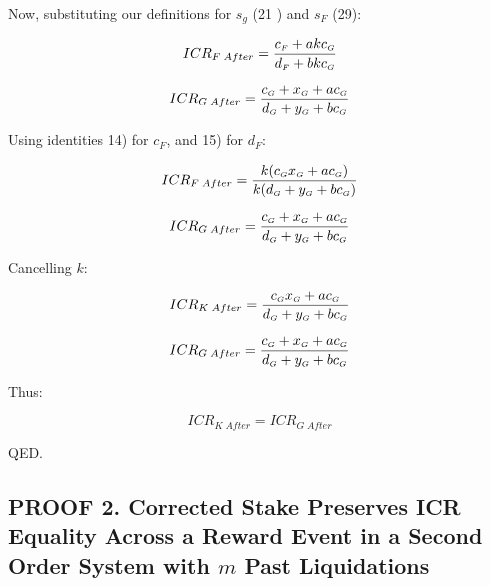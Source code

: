 \documentclass[reqno]{article}
\begin{document}
\bigskip
Now, substituting our definitions for $s_g$ (21 ) and $s_F$ (29):

\begin{equation} 
    ICR_{F \; After}=\frac{c_\mathsmaller{F}+akc_\mathsmaller{G}}{d_\mathsmaller{F}+bkc_\mathsmaller{G}}
\end{equation}

\begin{equation} 
    ICR_{G \; After}=\frac{c_\mathsmaller{G}+x_\mathsmaller{G}+ac_\mathsmaller{G}}{d_\mathsmaller{G}+y_\mathsmaller{G}+bc_\mathsmaller{G}}
\end{equation}

\bigskip
Using identities 14) for $c_F$, and 15) for $d_F$:

\begin{equation} 
    ICR_{F \; After}=\frac{k(c_\mathsmaller{G}x_\mathsmaller{G}+ac_\mathsmaller{G})}{k(d_\mathsmaller{G}+y_\mathsmaller{G}+bc_\mathsmaller{G})}
\end{equation}

\begin{equation} 
    ICR_{G \; After}=\frac{c_\mathsmaller{G}+x_\mathsmaller{G}+ac_\mathsmaller{G}}{d_\mathsmaller{G}+y_\mathsmaller{G}+bc_\mathsmaller{G}}
\end{equation}

\bigskip
Cancelling $k$:

\begin{equation} 
        ICR_{K \; After}=\frac{c_\mathsmaller{G}x_\mathsmaller{G}+ac_\mathsmaller{G}}{d_\mathsmaller{G}+y_\mathsmaller{G}+bc_\mathsmaller{G}}
\end{equation}

\begin{equation} 
    ICR_{G \; After}=\frac{c_\mathsmaller{G}+x_\mathsmaller{G}+ac_\mathsmaller{G}}{d_\mathsmaller{G}+y_\mathsmaller{G}+bc_\mathsmaller{G}}
\end{equation}

\bigskip
Thus:

\begin{equation} 
    ICR_{K \; After}=ICR_{G \; After}
\end{equation}

\bigskip
QED.

\subsection*{PROOF 2. Corrected Stake Preserves ICR Equality Across a Reward Event in a Second Order System with $m$ Past Liquidations}
\end{document}
